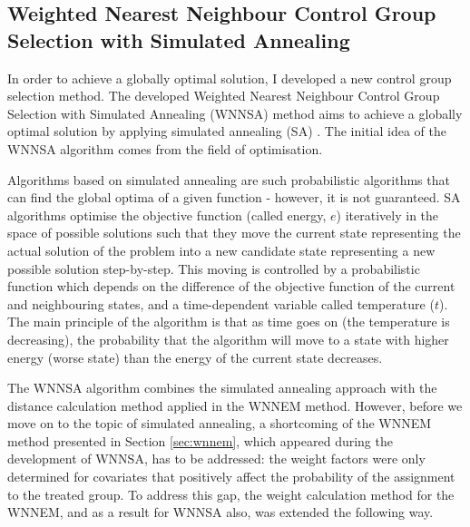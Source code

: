 		\subsection{Weighted Nearest Neighbour Control Group Selection with Simulated Annealing}
		\label{sec:wnnsa}
				     
								
		In order to achieve a globally optimal solution, I developed a new control group selection method. The developed Weighted Nearest Neighbour Control Group Selection with Simulated Annealing (WNNSA) method \cite{szeker2021optimized} aims to achieve a globally optimal solution by applying simulated annealing (SA) \cite{van1987simulated}. The initial idea of the WNNSA algorithm comes from the field of optimisation.
								
		Algorithms based on simulated annealing are such probabilistic algorithms that can find the global optima of a given function - however, it is not guaranteed. SA algorithms optimise the objective function (called energy, $e$) iteratively in the space of possible solutions such that they move the current state representing the actual solution of the problem into a new candidate state representing a new possible solution step-by-step. This moving is controlled by a probabilistic function which depends on the difference of the objective function of the current and neighbouring states, and a time-dependent variable called temperature ($t$). The main principle of the algorithm is that as time goes on (the temperature is decreasing), the probability that the algorithm will move to a state with higher energy (worse state) than the energy of the current state decreases.
								
		The WNNSA algorithm combines the simulated annealing approach with the distance calculation method applied in the WNNEM method. However, before we move on to the topic of simulated annealing, a shortcoming of the WNNEM method presented in Section \ref{sec:wnnem}, which appeared during the development of WNNSA, has to be addressed: the weight factors were only determined for covariates that positively affect the probability of the assignment to the treated group. To address this gap, the weight calculation method for the WNNEM, and as a result for WNNSA also, was extended the following way.
		  
